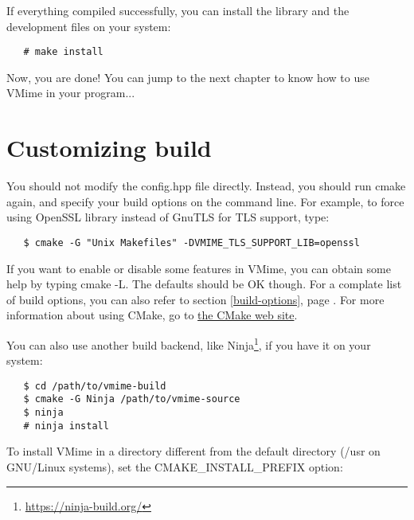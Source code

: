 If everything compiled successfully, you can install the library and
the development files on your system:

\begin{verbatim}
   # make install
\end{verbatim}


Now, you are done! You can jump to the next chapter to know how to use VMime
in your program...


\section{\label{custom-build}Customizing build}

You should not modify the {\vcode config.hpp} file directly. Instead, you
should run {\vcode cmake} again, and specify your build options on the command
line. For example, to force using OpenSSL library instead of GnuTLS for TLS
support, type:

\begin{verbatim}
   $ cmake -G "Unix Makefiles" -DVMIME_TLS_SUPPORT_LIB=openssl
\end{verbatim}

If you want to enable or disable some features in VMime, you can obtain some
help by typing {\vcode cmake -L}. The defaults should be OK though. For a
complate list of build options, you can also refer to section
\ref{build-options}, page \pageref{build-options}. For more information about
using CMake, go to \href{http://www.cmake.org/}{the CMake web site}.


You can also use another build backend, like
Ninja\footnote{\url{https://ninja-build.org/}}, if you have it on your system:

\begin{verbatim}
   $ cd /path/to/vmime-build
   $ cmake -G Ninja /path/to/vmime-source
   $ ninja
   # ninja install
\end{verbatim}

To install VMime in a directory different from the default directory
({\vcode /usr} on GNU/Linux systems), set the
{\vcode CMAKE\_INSTALL\_PREFIX} option:

